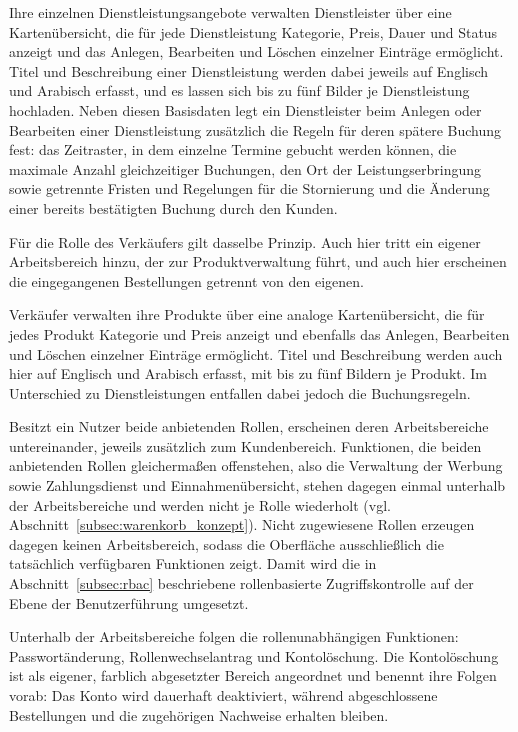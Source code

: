 Ihre einzelnen Dienstleistungsangebote verwalten Dienstleister über
eine Kartenübersicht, die für jede Dienstleistung Kategorie, Preis,
Dauer und Status anzeigt und das Anlegen, Bearbeiten und Löschen
einzelner Einträge ermöglicht. Titel und Beschreibung einer
Dienstleistung werden dabei jeweils auf Englisch und Arabisch
erfasst, und es lassen sich bis zu fünf Bilder je Dienstleistung
hochladen. Neben diesen Basisdaten legt ein Dienstleister beim
Anlegen oder Bearbeiten einer Dienstleistung zusätzlich die Regeln
für deren spätere Buchung fest: das Zeitraster, in dem einzelne
Termine gebucht werden können, die maximale Anzahl gleichzeitiger
Buchungen, den Ort der Leistungserbringung sowie getrennte Fristen
und Regelungen für die Stornierung und die Änderung einer bereits
bestätigten Buchung durch den Kunden.

Für die Rolle des Verkäufers gilt dasselbe Prinzip. Auch hier tritt
ein eigener Arbeitsbereich hinzu, der zur Produktverwaltung führt, und
auch hier erscheinen
die eingegangenen Bestellungen getrennt von den eigenen.

Verkäufer verwalten ihre Produkte über eine analoge Kartenübersicht,
die für jedes Produkt Kategorie und Preis anzeigt und ebenfalls das
Anlegen, Bearbeiten und Löschen einzelner Einträge ermöglicht. Titel
und Beschreibung werden auch hier auf Englisch und Arabisch erfasst,
mit bis zu fünf Bildern je Produkt. Im Unterschied zu
Dienstleistungen entfallen dabei jedoch die Buchungsregeln.

Besitzt ein Nutzer beide anbietenden Rollen, erscheinen deren
Arbeitsbereiche untereinander, jeweils zusätzlich zum Kundenbereich.
Funktionen, die beiden anbietenden Rollen gleichermaßen offenstehen,
also die Verwaltung der Werbung sowie Zahlungsdienst und
Einnahmenübersicht, stehen dagegen einmal unterhalb der
Arbeitsbereiche und werden nicht je Rolle wiederholt (vgl.
Abschnitt~\ref{subsec:warenkorb_konzept}).
Nicht zugewiesene Rollen erzeugen dagegen keinen Arbeitsbereich,
sodass die Oberfläche ausschließlich die tatsächlich verfügbaren
Funktionen zeigt. Damit wird die in Abschnitt~\ref{subsec:rbac}
beschriebene rollenbasierte Zugriffskontrolle auf der Ebene der
Benutzerführung umgesetzt.

Unterhalb der Arbeitsbereiche folgen die rollenunabhängigen
Funktionen: Passwortänderung, Rollenwechselantrag und Kontolöschung.
Die Kontolöschung ist als eigener, farblich abgesetzter Bereich
angeordnet und benennt ihre Folgen vorab: Das Konto wird dauerhaft
deaktiviert, während abgeschlossene Bestellungen und die zugehörigen
Nachweise erhalten bleiben.


